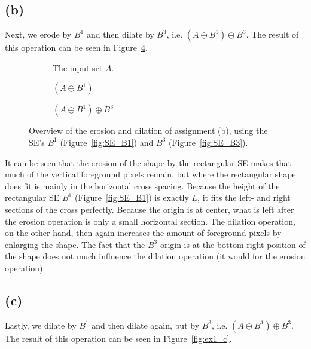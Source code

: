 \documentclass{article}
\begin{document}
\subsection*{(b)} Next, we erode by $B^1$ and then dilate by $B^3$, i.e. $(A \ominus B^1) \oplus B^3$. The result of this operation can be seen in Figure~\ref{fig:ex1_b}.

\begin{figure}[H]
     \centering
     \begin{subfigure}[b]{0.28\textwidth}
         \centering
         
         \caption{The input set $A$.}
         \label{fig:ex1_b-inputset}
     \end{subfigure}
     \hfill
     \begin{subfigure}[b]{0.29\textwidth}
         \centering
         
         \caption{$(A \ominus B^1)$}
         \label{fig:ex1_b-step1}
     \end{subfigure}
     \hfill
     \begin{subfigure}[b]{0.37\textwidth}
         \centering
         
         \caption{$(A \ominus B^1) \oplus B^3$}
         \label{fig:ex1_b-step2}
     \end{subfigure}
     
    \caption{Overview of the erosion and dilation of assignment (b), using the SE's $B^1$ (Figure~\ref{fig:SE_B1}) and $B^3$ (Figure~\ref{fig:SE_B3}).}
    \label{fig:ex1_b}
\end{figure}

It can be seen that the erosion of the shape by the rectangular SE makes that much of the vertical foreground pixels remain, but where the rectangular shape does fit is mainly in the horizontal cross spacing. Because the height of the rectangular SE $B^1$ (Figure~\ref{fig:SE_B1}) is exactly $L$, it fits the left- and right sections of the cross perfectly. Because the origin is at center, what is left after the erosion operation is only a small horizontal section. The dilation operation, on the other hand, then again increases the amount of foreground pixels by enlarging the shape. The fact that the $B^3$ origin is at the bottom right position of the shape does not much influence the dilation operation (it would for the erosion operation).

\subsection*{(c)} Lastly, we dilate by $B^1$ and then dilate again, but by $B^3$, i.e. $(A \oplus B^1) \oplus B^3$. The result of this operation can be seen in Figure~\ref{fig:ex1_c}.
\end{document}

